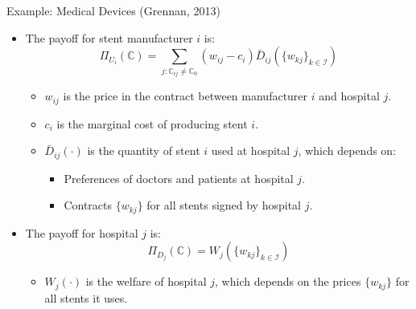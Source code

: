 \documentclass[aspectratio=169]{beamer}  %
\begin{document}
\begin{frame}{Example: Medical Devices (Grennan, 2013)}
    \begin{itemize}
        
        \item The payoff for stent manufacturer \(i\) is:
        \[
        \Pi_{U_i}(\mathbb{C}) = \sum_{j : \mathbb{C}_{ij} \neq \mathbb{C}_0} \left(w_{ij} - c_i\right) \bar{D}_{ij}\left(\{w_{kj}\}_{k \in \mathcal{I}}\right)
        \]
        \begin{itemize}
            \item \(w_{ij}\) is the price in the contract between manufacturer \(i\) and hospital \(j\).
            \item \(c_i\) is the marginal cost of producing stent \(i\).
            \item \(\bar{D}_{ij}(\cdot)\) is the quantity of stent \(i\) used at hospital \(j\), which depends on:
            \begin{itemize}
                \item Preferences of doctors and patients at hospital \(j\).
                \item Contracts \(\{w_{kj}\}\) for all stents signed by hospital \(j\).
            \end{itemize}
        \end{itemize}

        \item The payoff for hospital \(j\) is:
        \[
        \Pi_{D_j}(\mathbb{C}) = W_j\left(\{w_{kj}\}_{k \in \mathcal{I}}\right)
        \]
        \begin{itemize}
            \item \(W_j(\cdot)\) is the welfare of hospital \(j\), which depends on the prices \(\{w_{kj}\}\) for all stents it uses.
        \end{itemize}
    \end{itemize}
\end{frame}
\end{document}
